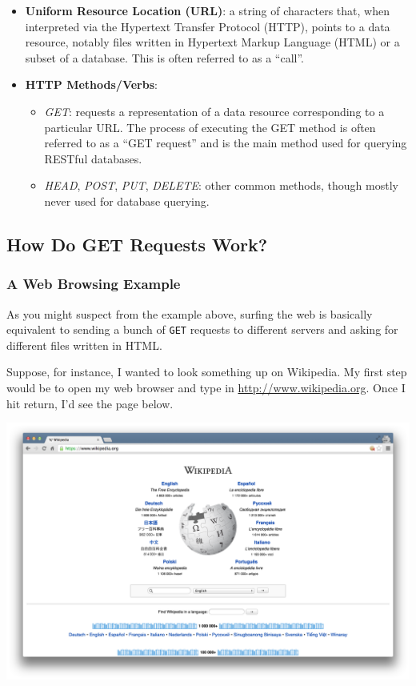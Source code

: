 \documentclass[]{book}
\begin{document}
\begin{itemize}
\item
  \textbf{Uniform Resource Location (URL)}: a string of characters that,
  when interpreted via the Hypertext Transfer Protocol (HTTP), points to
  a data resource, notably files written in Hypertext Markup Language
  (HTML) or a subset of a database. This is often referred to as a
  ``call''.
\item
  \textbf{HTTP Methods/Verbs}:

  \begin{itemize}
  \item
    \emph{GET}: requests a representation of a data resource
    corresponding to a particular URL. The process of executing the GET
    method is often referred to as a ``GET request'' and is the main
    method used for querying RESTful databases.
  \item
    \emph{HEAD}, \emph{POST}, \emph{PUT}, \emph{DELETE}: other common
    methods, though mostly never used for database querying.
  \end{itemize}
\end{itemize}

\subsection{How Do GET Requests Work?}\label{how-do-get-requests-work}

\subsubsection*{A Web Browsing Example}\label{a-web-browsing-example}

As you might suspect from the example above, surfing the web is
basically equivalent to sending a bunch of \texttt{GET} requests to
different servers and asking for different files written in HTML.

Suppose, for instance, I wanted to look something up on Wikipedia. My
first step would be to open my web browser and type in
\url{http://www.wikipedia.org}. Once I hit return, I'd see the page
below.

\begin{center}\includegraphics[width=0.7\linewidth]{img/wikipedia} \end{center}
\end{document}
